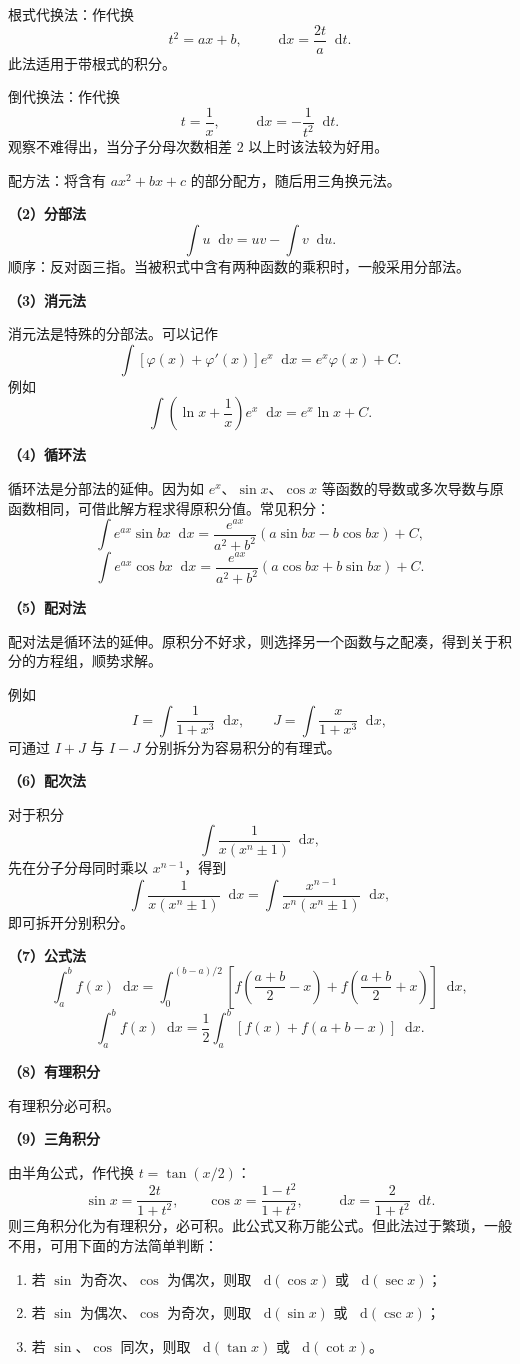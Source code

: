 \documentclass[UTF8,fontset=fandol,zihao=5]{ctexart}
\newcommand{\dd}{\mathop{}\!\mathrm{d}}
\begin{document}
根式代换法：作代换
\[
t^2=ax+b,\qquad\dd x=\frac{2t}{a}\dd t.
\]
此法适用于带根式的积分。

倒代换法：作代换
\[
t=\frac1x,\qquad\dd x=-\frac1{t^2}\dd t.
\]
观察不难得出，当分子分母次数相差 $2$ 以上时该法较为好用。

配方法：将含有 $ax^2+bx+c$ 的部分配方，随后用三角换元法。

\textbf{（2）分部法}
\[
\int u\dd v=uv-\int v\dd u.
\]
顺序：反对函三指。当被积式中含有两种函数的乘积时，一般采用分部法。

\textbf{（3）消元法}

消元法是特殊的分部法。可以记作
\[
\int[\varphi(x)+\varphi'(x)]e^x\dd x=e^x\varphi(x)+C.
\]
例如
\[
\int\left(\ln x+\frac1x\right)e^x\dd x=e^x\ln x+C.
\]

\textbf{（4）循环法}

循环法是分部法的延伸。因为如 $e^x$、$\sin x$、$\cos x$ 等函数的导数或多次导数与原函数相同，可借此解方程求得原积分值。常见积分：
\[
\int e^{ax}\sin bx\dd x
=\frac{e^{ax}}{a^2+b^2}(a\sin bx-b\cos bx)+C,
\]
\[
\int e^{ax}\cos bx\dd x
=\frac{e^{ax}}{a^2+b^2}(a\cos bx+b\sin bx)+C.
\]

\textbf{（5）配对法}

配对法是循环法的延伸。原积分不好求，则选择另一个函数与之配凑，得到关于积分的方程组，顺势求解。

例如
\[
I=\int\frac{1}{1+x^3}\dd x,
\qquad
J=\int\frac{x}{1+x^3}\dd x,
\]
可通过 $I+J$ 与 $I-J$ 分别拆分为容易积分的有理式。

\textbf{（6）配次法}

对于积分
\[
\int\frac{1}{x(x^n\pm1)}\dd x,
\]
先在分子分母同时乘以 $x^{n-1}$，得到
\[
\int\frac{1}{x(x^n\pm1)}\dd x
=\int\frac{x^{n-1}}{x^n(x^n\pm1)}\dd x,
\]
即可拆开分别积分。

\textbf{（7）公式法}
\[
\int_a^b f(x)\dd x
=\int_0^{(b-a)/2}\left[
f\left(\frac{a+b}{2}-x\right)
+f\left(\frac{a+b}{2}+x\right)
\right]\dd x,
\]
\[
\int_a^b f(x)\dd x
=\frac12\int_a^b[f(x)+f(a+b-x)]\dd x.
\]

\textbf{（8）有理积分}

有理积分必可积。

\textbf{（9）三角积分}

由半角公式，作代换 $t=\tan(x/2)$：
\[
\sin x=\frac{2t}{1+t^2},\qquad
\cos x=\frac{1-t^2}{1+t^2},\qquad
\dd x=\frac{2}{1+t^2}\dd t.
\]
则三角积分化为有理积分，必可积。此公式又称万能公式。但此法过于繁琐，一般不用，可用下面的方法简单判断：

\begin{enumerate}
  \item 若 $\sin$ 为奇次、$\cos$ 为偶次，则取 $\dd(\cos x)$ 或 $\dd(\sec x)$；
  \item 若 $\sin$ 为偶次、$\cos$ 为奇次，则取 $\dd(\sin x)$ 或 $\dd(\csc x)$；
  \item 若 $\sin$、$\cos$ 同次，则取 $\dd(\tan x)$ 或 $\dd(\cot x)$。
\end{enumerate}
\end{document}
